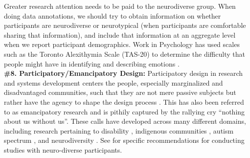 \documentclass{clv3}
\begin{document}
Greater research attention needs to be paid to the neurodiverse group. When doing data annotations, we should try to obtain information on whether participants are neurodiverse or neurotypical (when participants are comfortable sharing that information), and include that information at an aggregate level when we report participant demographics. Work in Psychology has used scales such as the Toronto Alexithymia Scale (TAS-20) to determine the difficulty that people might have in identifying and describing emotions \cite{bagby1994twenty}.\\ %


\noindent \textbf{\#8. Participatory/Emancipatory Design:} Participatory design in research and systems development centers the people, especially marginalized and disadvantaged communities, such that they are not mere passive subjects but rather have the agency to shape the design process \cite{spinuzzi2005methodology}. This has also been referred to as emancipatory research \cite{humphries2020arguments, noel2016promoting, oliver1997emancipatory} 
and is pithily captured by the rallying cry “nothing about us without us”. These calls have developed across many different domains, including research pertaining to disability \cite{stone1996parasites,seale2015negotiating}, 
indigenous communities \cite{hall2014not}, autism spectrum 
\cite{fletcher2019making,bertilsdotter2019doing}, and neurodiversity 
\cite{brosnan2017beyond,10.1007/978-3-030-25629-6_42}.
See \citet{10.1007/978-3-030-25629-6_42} for specific recommendations for conducting studies with neuro-diverse participants.\\
\end{document}
